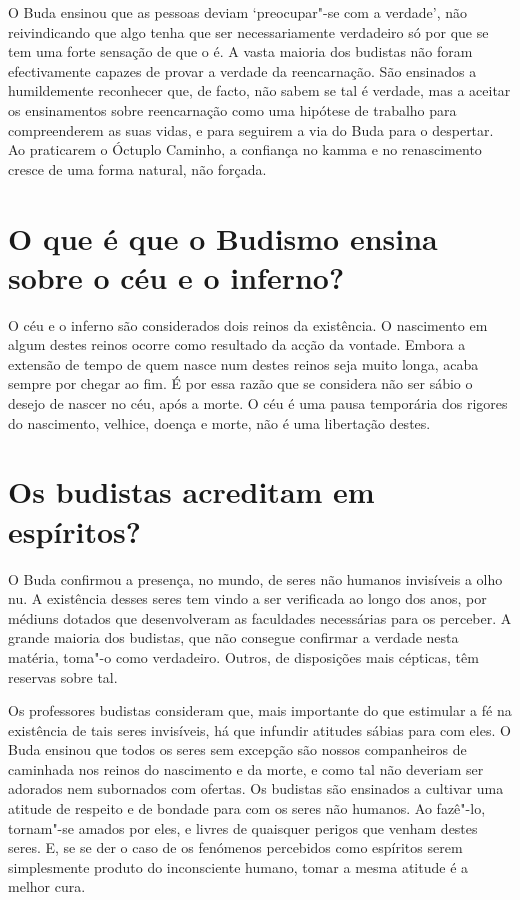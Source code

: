 O Buda ensinou que as pessoas deviam `preocupar"-se com a verdade', não
reivindicando que algo tenha que ser necessariamente verdadeiro só por
que se tem uma forte sensação de que o é. A vasta maioria dos budistas
não foram efectivamente capazes de provar a verdade da reencarnação. São
ensinados a humildemente reconhecer que, de facto, não sabem se tal é
verdade, mas a aceitar os ensinamentos sobre reencarnação como uma
hipótese de trabalho para compreenderem as suas vidas, e para seguirem a
via do Buda para o despertar. Ao praticarem o Óctuplo Caminho, a
confiança no kamma e no renascimento cresce de uma forma natural, não
forçada.

\section{O que é que o Budismo ensina sobre o céu e o inferno?}

O céu e o inferno são considerados dois reinos da existência. O
nascimento em algum destes reinos ocorre como resultado da acção da
vontade. Embora a extensão de tempo de quem nasce num destes reinos seja
muito longa, acaba sempre por chegar ao fim. É por essa razão que se
considera não ser sábio o desejo de nascer no céu, após a morte. O céu é
uma pausa temporária dos rigores do nascimento, velhice, doença e morte,
não é uma libertação destes.

\section{Os budistas acreditam em espíritos?}

O Buda confirmou a presença, no mundo, de seres não humanos invisíveis a
olho nu. A existência desses seres tem vindo a ser verificada ao longo
dos anos, por médiuns dotados que desenvolveram as faculdades
necessárias para os perceber. A grande maioria dos budistas, que não
consegue confirmar a verdade nesta matéria, toma"-o como verdadeiro.
Outros, de disposições mais cépticas, têm reservas sobre tal.

Os professores budistas consideram que, mais importante do que estimular
a fé na existência de tais seres invisíveis, há que infundir atitudes
sábias para com eles. O Buda ensinou que todos os seres sem excepção são
nossos companheiros de caminhada nos reinos do nascimento e da morte, e
como tal não deveriam ser adorados nem subornados com ofertas. Os
budistas são ensinados a cultivar uma atitude de respeito e de bondade
para com os seres não humanos. Ao fazê"-lo, tornam"-se amados por eles, e
livres de quaisquer perigos que venham destes seres. E, se se der o caso
de os fenómenos percebidos como espíritos serem simplesmente produto do
inconsciente humano, tomar a mesma atitude é a melhor cura.

